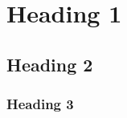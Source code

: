 \documentclass[10pt,a4paper]{article}
\begin{document}
\tableofcontents 

\section{Heading 1}
\subsection{Heading 2}
\subsubsection{Heading 3}
\end{document}
